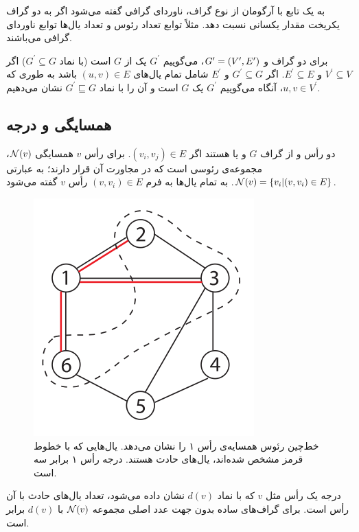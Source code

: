 به یک تابع با آرگومان از نوع گراف، ناوردای گرافی
 گفته می‌شود اگر به دو گراف یکریخت مقدار یکسانی نسبت دهد. مثلاً توابع تعداد رئوس و تعداد یال‌ها توابع ناوردای گرافی می‌باشند.

برای دو گراف  و $G^{\prime} = (V^{\prime},E^{\prime})$، می‌گوییم $G^{\prime}$ یک  از $G$ است (با نماد $G^\prime \subseteq G$) اگر $V^\prime \subseteq V$ و $E^\prime \subseteq E$. اگر $G^\prime \subseteq G$ و $E^\prime$ شامل تمام یال‌های $(u,v) \in E$ باشد به طوری که $u,v \in V^\prime$، آنگاه می‌گوییم $G^\prime$ یک  $G$ است و آن را با نماد $G^\prime \sqsubseteq G$ نشان می‌دهیم.

\subsection{همسایگی و درجه}
دو رأس \Vi و \Vj از گراف $G$  و یا  هستند اگر $(v_i,v_j) \in E$. برای رأس $v$ همسایگی $\mathcal{N}(v)$، مجموعه‌ی رئوسی است که در مجاورت آن قرار دارند؛ به عبارتی
$\mathcal{N}(v) = \{v_i | (v,v_i) \in E\}$.
به تمام یال‌ها به فرم $(v,v_i) \in E$  رأس $v$ گفته می‌شود.

\begin{figure}[ht]
\centering
\includegraphics[scale=0.4]{./neighbours.png}
\caption{خط‌چین‌ رئوس همسایه‌ی رأس ۱ را نشان می‌دهد. یال‌هایی که با خطوط قرمز مشخص شده‌اند، یال‌های حادث هستند. درجه رأس ۱ برابر سه است.}
\label{fig:neighbours}
\end{figure}

درجه یک رأس مثل $v$ که با نماد $d(v)$ نشان داده می‌شود، تعداد یال‌های حادث با آن رأس است. برای گراف‌های ساده بدون جهت عدد اصلی مجموعه $\mathcal{N}(v)$ با $d(v)$ برابر است.

